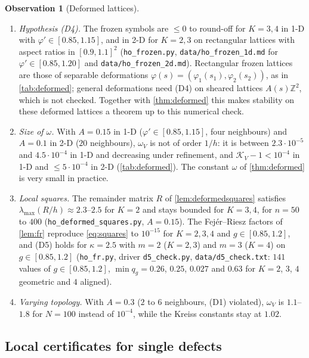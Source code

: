 \documentclass[11pt,a4paper]{article}
\theoremstyle{plain}
\theoremstyle{definition}
\newtheorem{observation}[theorem]{Observation}
\theoremstyle{remark}
\numberwithin{equation}{section}
\newcommand{\Z}{\mathbb{Z}}
\begin{document}
\begin{observation}[Deformed lattices]\label{obs:deformed}
\begin{enumerate}[label=(\roman*)]
\item \emph{Hypothesis (D4).} The frozen symbols are $\le0$ to round-off for $K=3,4$ in 1-D with $\varphi'\in[0.85,1.15]$, and in 2-D for $K=2,3$ on rectangular lattices with aspect ratios in $[0.9,1.1]^2$ (\texttt{ho\_frozen.py}, \texttt{data/ho\_frozen\_1d.md} for $\varphi'\in[0.85,1.20]$ and \texttt{data/ho\_frozen\_2d.md}). Rectangular frozen lattices are those of separable deformations $\varphi(s)=(\varphi_1(s_1),\varphi_2(s_2))$, as in \cref{tab:deformed}; general deformations need (D4) on sheared lattices $A(s)\Z^2$, which is not checked. Together with \cref{thm:deformed} this makes stability on these deformed lattices a theorem up to this numerical check.
\item \emph{Size of $\omega$.} With $A=0.15$ in 1-D ($\varphi'\in[0.85,1.15]$, four neighbours) and $A=0.1$ in 2-D ($20$ neighbours), $\omega_V$ is not of order $1/h$: it is between $2.3\cdot10^{-5}$ and $4.5\cdot10^{-4}$ in 1-D and decreasing under refinement, and $\mathcal K_V-1<10^{-4}$ in 1-D and $\le5\cdot10^{-4}$ in 2-D (\cref{tab:deformed}). The constant $\omega$ of \cref{thm:deformed} is very small in practice.
\item \emph{Local squares.} The remainder matrix $R$ of \cref{lem:deformedsquares} satisfies $\lambda_{\max}(R/h)\approx2.3$--$2.5$ for $K=2$ and stays bounded for $K=3,4$, for $n=50$ to $400$ (\texttt{ho\_deformed\_squares.py}, $A=0.15$). The Fej\'er--Riesz factors of \cref{lem:fr} reproduce \eqref{eq:squares} to $10^{-15}$ for $K=2,3,4$ and $g\in[0.85,1.2]$, and (D5) holds for $\kappa=2.5$ with $m=2$ ($K=2,3$) and $m=3$ ($K=4$) on $g\in[0.85,1.2]$ (\texttt{ho\_fr.py}, driver \texttt{d5\_check.py}, \texttt{data/d5\_check.txt}: $141$ values of $g\in[0.85,1.2]$, $\min q_g=0.26$, $0.25$, $0.027$ and $0.63$ for $K=2$, $3$, $4$ geometric and $4$ aligned).
\item \emph{Varying topology.} With $A=0.3$ ($2$ to $6$ neighbours, (D1) violated), $\omega_V$ is $1.1$--$1.8$ for $N=100$ instead of $10^{-4}$, while the Kreiss constants stay at $1.02$.
\end{enumerate}
\end{observation}

\subsection{Local certificates for single defects}
\end{document}

